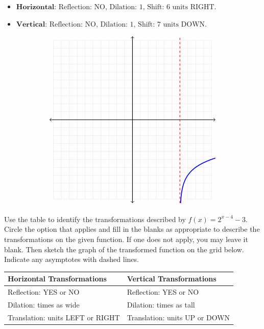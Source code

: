 \documentclass[addpoints]{exam}
\begin{document}
\begin{questions}
\begin{center}
\end{center}
\begin{solution}
\begin{itemize}
\item
 \(\textbf{Horizontal: } \text{Reflection: NO, Dilation: 1, Shift: 6 units RIGHT.}\) 

\item
 \(\textbf{Vertical: } \text{Reflection: NO, Dilation: 1, Shift: 7 units DOWN.}\) 

\end{itemize}


 \[\begin{tikzpicture}[scale=0.39] \draw[step=1cm, gray!40, very thin] (-10,-10) grid (10,10); \draw[thick, <->] (-10.5,0) -- (10.5,0); \draw[thick, <->] (0,-10.5) -- (0,10.5); \clip (-10.5,-10.5) rectangle (10.5,10.5);\draw[dashed, red, thick] (6, -10.5) -- (6, 10.5);\draw[blue, very thick, samples=100, domain=6.01000000000000:10.5000000000000, smooth] plot (\x, {(ln(\x - (6))/ln(2)) + (-7)});\end{tikzpicture}\]
\end{solution}
\newpage


\question[5]  Use the table to identify the transformations described by $f(x)=2^{x - 4} - 3$. Circle the option that applies and fill in the blanks as appropriate to describe the transformations on the given function. If one does not apply, you may leave it blank. Then sketch the graph of the transformed function on the grid below. Indicate any asymptotes with dashed lines.\\
\begin{table}[h]
    \renewcommand{\arraystretch}{3} 
    \centering
    \begin{tabular}{|l|l|}
        \hline
        \textbf{Horizontal Transformations}               & \textbf{Vertical Transformations}              \\ \hline
        Reflection: YES    or     NO       & Reflection:       YES    or     NO    \\ \hline
        Dilation: \underline{\hspace{2cm}} times as wide           & Dilation: \underline{\hspace{2cm}} times as tall        \\ \hline
        Translation: \underline{\hspace{2cm}} units LEFT or RIGHT & Translation: \underline{\hspace{2cm}} units UP or DOWN \\ \hline
    \end{tabular}
\end{table}


\end{questions}
\end{document}
